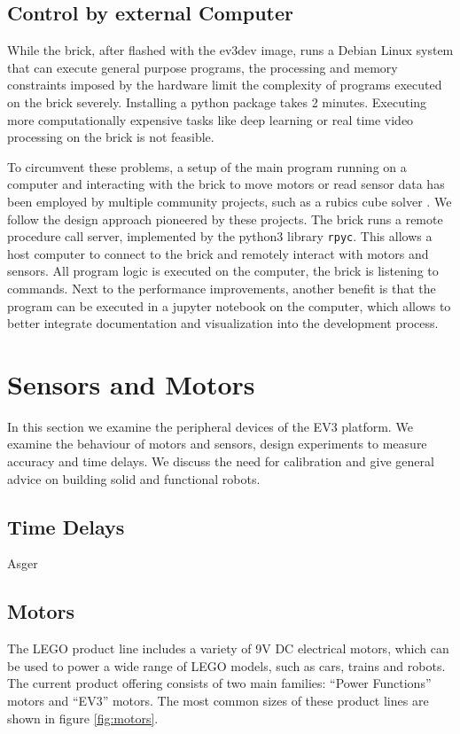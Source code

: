 \documentclass[11pt, a4paper]{article}
\begin{document}
\subsection{Control by external Computer}
While the brick, after flashed with the ev3dev image, runs a Debian Linux system that can execute general purpose programs, the processing and memory constraints imposed by the hardware limit the complexity of programs executed on the brick severely. Installing a python package takes 2 minutes. Executing more computationally expensive tasks like deep learning or real time video processing on the brick is not feasible.

To circumvent these problems, a setup of the main program running on a computer and interacting with the brick to move motors or read sensor data has been employed by multiple community projects, such as a rubics cube solver \cite{ev3_rubics}. We follow the design approach pioneered by these projects. The brick runs a remote procedure call server, implemented by the python3 library \texttt{rpyc}. This allows a host computer to connect to the brick and remotely interact with motors and sensors. All program logic is executed on the computer, the brick is listening to commands. Next to the performance improvements, another benefit is that the program can be executed in a jupyter notebook on the computer, which allows to better integrate documentation and visualization into the development process.

\section{Sensors and Motors}
In this section we examine the peripheral devices of the EV3 platform. We examine the behaviour of motors and sensors, design experiments to measure accuracy and time delays. We discuss the need for calibration and give general advice on building solid and functional robots.
\subsection{Time Delays}
Asger

\subsection{Motors}
The LEGO product line includes a variety of 9V DC electrical motors, which can be used to power a wide range of LEGO models, such as cars, trains and robots. The current product offering consists of two main families: ``Power Functions'' motors and ``EV3'' motors. The most common sizes of these product lines are shown in figure \ref{fig:motors}.
\end{document}
